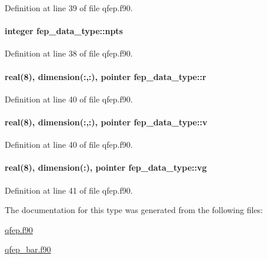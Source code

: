 Definition at line 39 of file qfep.\-f90.

\hypertarget{structfep__data__type_a6fb147378c618fed80fb6fe1c3449e7c}{
\paragraph[{npts}]{\setlength{\rightskip}{0pt plus 5cm}integer fep\-\_\-data\-\_\-type\-::npts}}\label{structfep__data__type_a6fb147378c618fed80fb6fe1c3449e7c}


Definition at line 38 of file qfep.\-f90.

\hypertarget{structfep__data__type_a85a22cc6dc5586b9894f876b1949bd2c}{
\paragraph[{r}]{\setlength{\rightskip}{0pt plus 5cm}real(8), dimension(\-:,\-:), pointer fep\-\_\-data\-\_\-type\-::r}}\label{structfep__data__type_a85a22cc6dc5586b9894f876b1949bd2c}


Definition at line 40 of file qfep.\-f90.

\hypertarget{structfep__data__type_a16f99471c659ed557932977a16294611}{
\paragraph[{v}]{\setlength{\rightskip}{0pt plus 5cm}real(8), dimension(\-:,\-:), pointer fep\-\_\-data\-\_\-type\-::v}}\label{structfep__data__type_a16f99471c659ed557932977a16294611}


Definition at line 40 of file qfep.\-f90.

\hypertarget{structfep__data__type_a3fd66676e42d2d853dece6db591ad19d}{
\paragraph[{vg}]{\setlength{\rightskip}{0pt plus 5cm}real(8), dimension(\-:), pointer fep\-\_\-data\-\_\-type\-::vg}}\label{structfep__data__type_a3fd66676e42d2d853dece6db591ad19d}


Definition at line 41 of file qfep.\-f90.



The documentation for this type was generated from the following files\-:\begin{DoxyCompactItemize}
\item 
\hyperlink{qfep_8f90}{qfep.\-f90}\item 
\hyperlink{qfep__bar_8f90}{qfep\-\_\-bar.\-f90}\end{DoxyCompactItemize}
